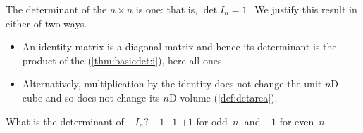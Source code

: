 \begin{example} \label{eg:detident}
The determinant of the \(n\times n\)  is one: that is, \(\det I_n=1\)\,. 
We justify this result in either of two ways.
\begin{itemize}
\item An identity matrix is a diagonal matrix and hence its determinant is the product of the  (\autoref{thm:basicdet:i}), here all ones. 
\item Alternatively, multiplication by the identity does not change the unit $n$D-cube and so does not change its $n$D-volume (\autoref{def:detarea}).
\end{itemize}
\end{example}





\begin{activity}
What is the determinant of \(-I_n\)?
{\(-1\)}{\(+1\)}
{\(+1\) for odd~\(n\), and \(-1\) for even~\(n\)}
\end{activity}






